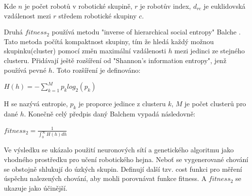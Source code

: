 \par 
Kde $n$ je počet robotů v robotické skupině, $r$ je robotův index, $d_{rc}$ je euklidovská vzdálenost mezi $r$ středem robotické skupiny $c$. 
\par
Druhá $fitness_2$ používá metodu "inverse of hierarchical social entropy" Balche \citep{balch2000hierarchic}. Tato metoda počítá kompaktnost skupiny, tím že hledá každý možnou skupinku(cluster) pomocí změn maximální vzdálenosti $h$ mezi jedinci ze stejného clusteru. Přidávají ještě rozšíření od "Shannon's information entropy", jenž používá pevné $h$. Toto rozšíření je definováno: 
\par 
\begin{center}
\textbf{$H(h)=-\sum\limits_{k=1}^{M} p_k log_2(p_k)$}
\end{center}
\par 
H se nazývá entropie, $p_k$ je proporce jedince z clusteru $k$, $M$ je počet clusterů pro dané $h$. Konečně celý předpis daný Balchem vypadá následovně: 
\par
\begin{center}
\textbf{$fitness_2 = \frac{1}{\int_{0}^{\infty}H(h)dh}$}
\end{center}
\par 
Ve výsledku se ukázalo použití neuronových sítí a genetického algoritmu jako vhodného prostředku pro učení robotického hejna. Neboť se vygenerované chování se obstojně shlukují do úzkých skupin. Definují další tzv. cost funkci pro měření úspěchu nalezených chování, aby mohli porovnávat funkce fitness. A $fitness_2$ se ukazuje jako účinější. 
